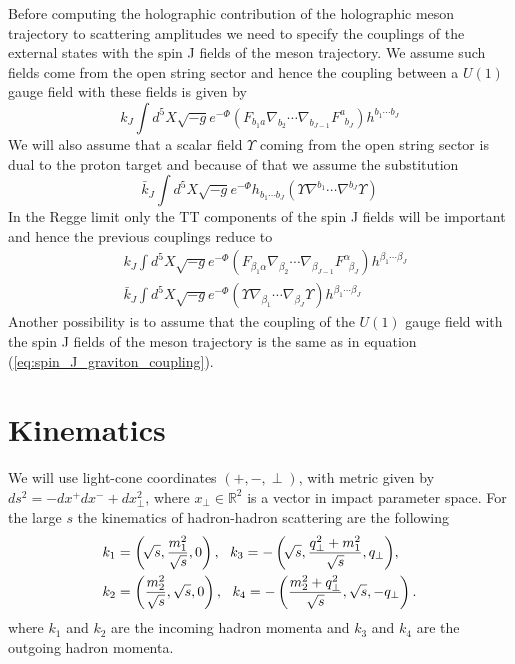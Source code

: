 \documentclass[a4paper,12pt]{article}
\begin{document}
Before computing the holographic contribution of the holographic meson trajectory to scattering amplitudes we need to specify the couplings of the external states with the spin J fields of the meson trajectory. We assume such fields come from the open string sector and hence the coupling between a $U(1)$ gauge field  with these fields is given by
\begin{equation}
k_J \int d^5X \sqrt{-g} e^{-\Phi} \left(F_{b_1 a} \nabla_{b_2} \cdots \nabla_{b_{J-1}} F^{a}_{\, \, \, b_J}  \right) h^{b_1 \cdots b_J}
\label{eq:open_string_spin_J_coupling}
\end{equation}
We will also assume that a scalar field $\Upsilon$ coming from the open string sector is dual to the proton target and because of that we assume the substitution
\begin{equation}
\bar{k}_J \int d^5 X \sqrt{-g} e^{-\Phi} h_{b_1 \cdots b_J} \left( \Upsilon \nabla^{b_1} \cdots \nabla^{b_J} \Upsilon \right)
\end{equation}
In the Regge limit only the TT components of the spin J fields will be important and hence the previous couplings reduce to 
\begin{align}
&k_J \int d^5X \sqrt{-g} e^{-\Phi} \left(F_{\beta_1 \alpha} \nabla_{\beta_2} \cdots \nabla_{\beta_{J-1}} F^{\alpha}_{\, \, \, \beta_J}  \right) h^{\beta_1 \cdots \beta_J} \\
&\bar{k}_J \int d^5 X \sqrt{-g} e^{-\Phi}  \left( \Upsilon \nabla_{\beta_1} \cdots \nabla_{\beta_J} \Upsilon \right)h^{\beta_1 \cdots \beta_J}
\label{eq:meson_spin_J_couplings}
\end{align}
Another possibility is to assume that the coupling of the $U\left(1\right)$ gauge field with the spin J fields of the meson trajectory is the same as in equation (\ref{eq:spin_J_graviton_coupling}).

\section{Kinematics}
We will use light-cone coordinates $\left( +, -, \perp \right)$, with metric given by $ds^2 = - dx^{+} dx^{-} + dx_\perp^2$, where $x_\perp \in \mathbb{R}^2$ is a vector in impact parameter space.
For the large $s$ the kinematics of hadron-hadron scattering are the following
\begin{align}
\label{eq:pp_kinematics}
&k_1=\left(\!\sqrt{s},\frac{m_1^2}{\sqrt{s}} ,0\right),\  \ k_3=-\left(\!\sqrt{s},\frac{ q_\perp^2 +m_1^2}{\sqrt{s}} , q_\perp \right)\!,\\
&k_2=\left(\frac{m_2^2}{\sqrt{s}},\sqrt{s} ,0\right),\  \ k_4=-\left(\frac{m_2^2+ q_\perp^2}{\sqrt{s}},\sqrt{s} ,-q_\perp \right).\notag
\end{align}
where $k_1$ and $k_2$ are the incoming hadron momenta and $k_3$ and $k_4$ are the outgoing hadron momenta.
\end{document}
